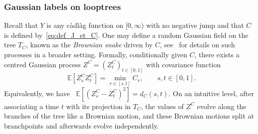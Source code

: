 \documentclass[british, a4paper,11pt]{article}
\numberwithin{equation}{section}
\theoremstyle{definition}
\newcommand{\E}{\mathop{}\!\mathbb{E}}
\begin{document}
\subsubsection*{Gaussian labels on looptrees}

Recall that $Y$ is any c\`adl\`ag function on $[0, \infty)$ with no negative jump and that $C$ is defined by~\eqref{eq:def_J_et_C}.
One may define a random Gaussian field on the tree $T_C$, known as the \emph{Brownian snake} driven by $C$, see~\cite[Chapter~4]{DLG02} for details on such processes in a broader setting. Formally, conditionally given $C$, there exists a centred Gaussian process $Z^C = (Z^C_t)_{t \in [0,1]}$ with covariance function
\[\E[Z^C_s Z^C_t] = \min_{r \in [s,t]} C_r,
\qquad s,t \in [0,1].\]
Equivalently, we have $\E[(Z^C_s-Z^C_t)^2] = d_C(s,t)$.
On an intuitive level, after associating a time $t$ with its projection in $T_C$, the values of $Z^C$ evolve along the branches of the tree like a Brownian motion, and these Brownian motions split at branchpoints and afterwards evolve independently.
\end{document}
